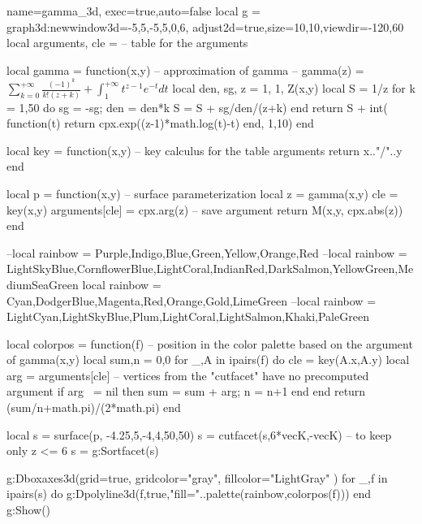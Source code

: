 \documentclass[10pt]{standalone}
\begin{document}
\begin{luadraw}{name=gamma_3d, exec=true,auto=false}
local g = graph3d:new{window3d={-5,5,-5,5,0,6}, adjust2d=true,size={10,10},viewdir={-120,60}}
local arguments, cle = {} -- table for the arguments

local gamma = function(x,y) -- approximation of gamma
-- gamma(z) = $\sum_{k=0}^{+\infty} \frac{(-1)^k}{k!(z+k)} + \int_1^{+\infty} t^{z-1}e^{-t}dt$
    local den, sg, z = 1, 1, Z(x,y)
    local S = 1/z
    for k = 1,50 do
        sg = -sg; den = den*k
        S = S + sg/den/(z+k)
    end
    return S + int( function(t) return cpx.exp((z-1)*math.log(t)-t) end, 1,10)
end

local key = function(x,y) -- key calculus for the table arguments
    return x.."/"..y
end

local  p = function(x,y) -- surface parameterization
    local z = gamma(x,y)
    cle = key(x,y)
    arguments[cle] = cpx.arg(z) -- save argument
    return M(x,y, cpx.abs(z))
end

--local rainbow = {Purple,Indigo,Blue,Green,Yellow,Orange,Red}
--local rainbow = {LightSkyBlue,CornflowerBlue,LightCoral,IndianRed,DarkSalmon,YellowGreen,MediumSeaGreen}
local rainbow = {Cyan,DodgerBlue,Magenta,Red,Orange,Gold,LimeGreen}
--local rainbow = {LightCyan,LightSkyBlue,Plum,LightCoral,LightSalmon,Khaki,PaleGreen}

local colorpos = function(f)  -- position in the color palette based on the argument of gamma(x,y)
    local sum,n = 0,0
    for _,A in ipairs(f) do
        cle = key(A.x,A.y)
        local arg = arguments[cle] -- vertices from the "cutfacet" have no precomputed argument
        if arg ~= nil then sum = sum + arg; n = n+1
        end
    end
    return (sum/n+math.pi)/(2*math.pi)
end

local s = surface(p, -4.25,5,-4,4,{50,50})
s = cutfacet(s,{6*vecK,-vecK})  -- to keep only z <= 6
s = g:Sortfacet(s)

g:Dboxaxes3d({grid=true, gridcolor="gray", fillcolor="LightGray" })
for _,f in ipairs(s) do
    g:Dpolyline3d(f,true,"fill="..palette(rainbow,colorpos(f)))
end
g:Show()
\end{luadraw}
\end{document}
